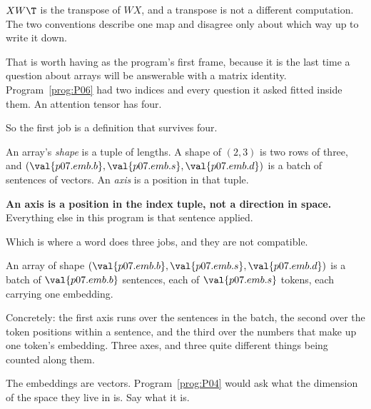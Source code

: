 \begin{fr}
$XW\T$ is the transpose of $WX$, and a transpose is not a different
computation. The two conventions describe one map and disagree only about
which way up to write it down.

That is worth having as the program's first frame, because it is the last time
a question about arrays will be answerable with a matrix identity.
Program~\ref{prog:P06} had two indices and every question it asked fitted
inside them. An attention tensor has four.
\end{fr}

\begin{fr}
So the first job is a definition that survives four.

An array's \emph{shape} is a tuple of lengths. A shape of $(2, 3)$ is two rows
of three, and $(\val{p07.emb.b}, \val{p07.emb.s}, \val{p07.emb.d})$ is a batch
of sentences of vectors. An \emph{axis} is a position in that tuple.

\textbf{An axis is a position in the index tuple, not a direction in space.}
Everything else in this program is that sentence applied.
\end{fr}

\begin{fr}
Which is where a word does three jobs, and they are not compatible.

An array of shape $(\val{p07.emb.b}, \val{p07.emb.s}, \val{p07.emb.d})$ is a
batch of $\val{p07.emb.b}$ sentences, each of $\val{p07.emb.s}$ tokens, each
carrying one embedding.

Concretely: the first axis runs over the sentences in the batch, the second
over the token positions within a sentence, and the third over the numbers that
make up one token's embedding. Three axes, and three quite different things
being counted along them.

The embeddings are vectors. Program~\ref{prog:P04} would ask what the dimension
of the space they live in is. Say what it is.
\dotline
\nextframe
\end{fr}

